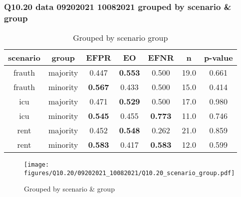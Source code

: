 \subsubsection{Q10.20 data 09202021 10082021 grouped by scenario \& group}

\begin{comment}
                        EFPR        EO      EFNR     n    pvalue
(frauth, majority)  0.447368  0.552632  0.500000  19.0  0.661128
(frauth, minority)  0.566667  0.433333  0.500000  15.0  0.414216
(icu, majority)     0.470588  0.529412  0.500000  17.0  0.980270
(icu, minority)     0.545455  0.454545  0.772727  11.0  0.745603
(rent, majority)    0.452381  0.547619  0.261905  21.0  0.858984
(rent, minority)    0.583333  0.416667  0.583333  12.0  0.598642
\end{comment}

\begin{table}[h]
    \centering
    \begin{tabular}{|c|c|c|c|c|c|c|}
        \hline
        scenario & group & EFPR & EO & EFNR & n & p-value\\
        \hline
        frauth & majority & 0.447 & \textbf{0.553} & 0.500 & 19.0 & 0.661\\
		frauth & minority & \textbf{0.567} & 0.433 & 0.500 & 15.0 & 0.414\\
		icu & majority & 0.471 & \textbf{0.529} & 0.500 & 17.0 & 0.980\\
		icu & minority & \textbf{0.545} & 0.455 & \textbf{0.773} & 11.0 & 0.746\\
		rent & majority & 0.452 & \textbf{0.548} & 0.262 & 21.0 & 0.859\\
		rent & minority & \textbf{0.583} & 0.417 & \textbf{0.583} & 12.0 & 0.599\\
		
        \hline
    \end{tabular}
    \caption{Grouped by scenario group}
    \label{tab:my_label}
\end{table}
\begin{figure}[h]
    \centering
    \texttt{[image: figures/Q10.20/09202021\_10082021/Q10.20\_scenario\_group.pdf]}
    \caption{Grouped by scenario \& group}
    \label{fig:my_label}
\end{figure}
